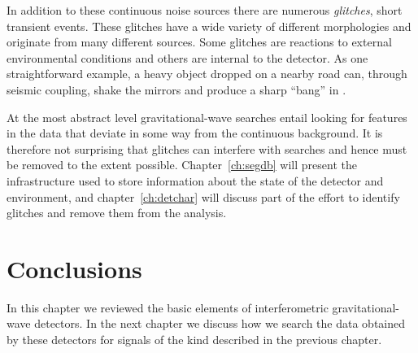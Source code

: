 In addition to these continuous noise sources there are numerous
\emph{glitches}, short transient events.  These glitches have a wide
variety of different morphologies and originate from many different
sources.  Some glitches are reactions to external environmental
conditions and others are internal to the detector.  As one
straightforward example, a heavy object dropped on a nearby road 
can, through seismic coupling, shake the mirrors and produce a sharp
``bang'' in \darmerr.

At the most abstract level gravitational-wave searches entail looking
for features in the data that deviate in some way from the continuous
background.  It is therefore not surprising that glitches can
interfere with searches and hence must be removed to the extent
possible.  Chapter~\ref{ch:segdb} will present the infrastructure used
to store information about the state of the detector and environment,
and chapter~\ref{ch:detchar} will discuss part of the effort to
identify glitches and remove them from the analysis.

\section{Conclusions}

In this chapter we reviewed the basic elements of interferometric
gravitational-wave detectors.  In the next chapter we discuss how we
search the data obtained by these detectors for signals of the kind
described in the previous chapter.


